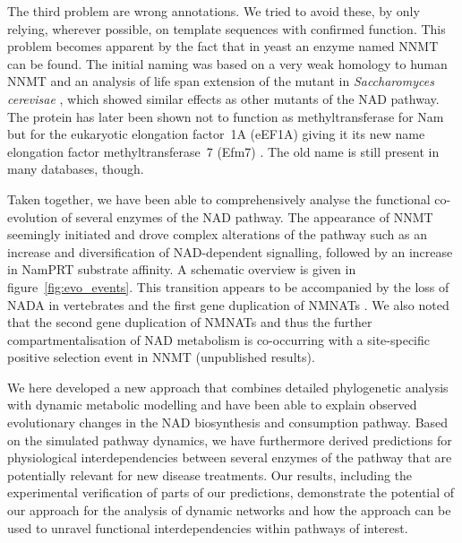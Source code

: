 The third problem are wrong annotations. We tried to avoid these, by only relying, wherever possible,  on template sequences with confirmed function. This problem becomes apparent by the fact that in yeast an enzyme named NNMT can be found. The initial naming was based on a very weak homology to human NNMT and an analysis of life span extension of the mutant in \textit{Saccharomyces cerevisae} \cite{Anderson2003}, which showed similar effects as other mutants of the NAD pathway. The protein has later been shown not to function as methyltransferase for Nam but for the eukaryotic elongation factor~1A (eEF1A) giving it its new name elongation factor methyltransferase~7 (Efm7) \cite{Hamey2016}. The old name is still present in many databases, though.

Taken together, we have been able to comprehensively analyse the functional co-evolution of several enzymes of the NAD pathway. The appearance of NNMT seemingly initiated and drove complex alterations of the pathway such as an increase and diversification of NAD-dependent signalling, followed by an increase in NamPRT substrate affinity. A schematic overview is given in figure~\ref{fig:evo_events}. This transition appears to be accompanied by the loss of NADA in vertebrates and the first gene duplication of NMNATs \cite{Lau2010}. We also noted that the second gene duplication of NMNATs and thus the further compartmentalisation of NAD metabolism is co-occurring with a site-specific positive selection event in NNMT (unpublished results).

We here developed a new approach that combines detailed phylogenetic analysis with dynamic metabolic modelling and have been able to explain observed evolutionary changes in the NAD biosynthesis and consumption pathway. Based on the simulated pathway dynamics, we have furthermore derived predictions for physiological interdependencies between several enzymes of the pathway that are potentially relevant for new disease treatments. Our results, including the experimental verification of parts of our predictions, demonstrate the potential of our approach for the analysis of dynamic networks and how the approach can be used to unravel functional interdependencies within pathways of interest.
